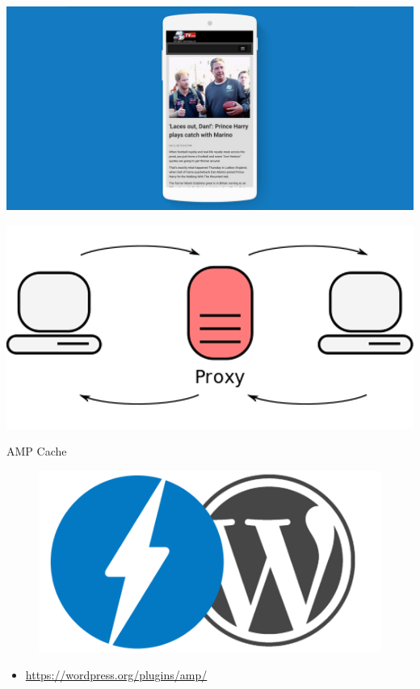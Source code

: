 \documentclass[graphic, aspectratio=169]{beamer}
\begin{document}
{\includegraphics[width=\paperwidth,height=\paperheight]{images/amp_example.jpg}}
\begin{frame}
\end{frame}

{\includegraphics[width=\paperwidth,height=\paperheight]{images/proxy.png}}
\begin{frame}{AMP Cache}
\end{frame}

\begin{frame}
    \begin{figure}
        \centering
        \includegraphics[scale=0.3]{images/amp+wp.png}
        \label{fig:amp+wordpress}
    \end{figure}
    \begin{itemize}
        \item \url{https://wordpress.org/plugins/amp/}
    \end{itemize}
\end{frame}
\end{document}
